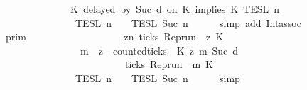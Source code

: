 \begin{isabellebody}
\ \ \ \ \ \ \ \ \ \ \ \ \ \ \ \ {\isasyminter}\ {\isasymlbrakk}\ K\ delayed\ by\ {\isacharparenleft}Suc\ d{\isacharparenright}\ on\ K\ implies\ K\ {\isasymrbrakk}\isactrlsub T\isactrlsub E\isactrlsub S\isactrlsub L\isactrlbsup {\isasymge}\ n\isactrlesup \isanewline
\ \ \ \ \ \ \ \ \ \ \ \ \ \ \ \ {\isasyminter}\ {\isasymlbrakk}{\isasymlbrakk}\ {\isasymPsi}\ {\isasymrbrakk}{\isasymrbrakk}\isactrlsub T\isactrlsub E\isactrlsub S\isactrlsub L\isactrlbsup {\isasymge}\ n\isactrlesup \ {\isasyminter}\ {\isasymlbrakk}{\isasymlbrakk}\ {\isasymPhi}\ {\isasymrbrakk}{\isasymrbrakk}\isactrlsub T\isactrlsub E\isactrlsub S\isactrlsub L\isactrlbsup {\isasymge}\ Suc\ n\isactrlesup {\isacartoucheclose}\isanewline
\ \ \ \ \isamarkupfalse%
\ {\isacharparenleft}simp\ add{\isacharcolon}\ Int{\isacharunderscore}assoc{\isacharparenright}\isanewline
\ \ \isamarkupfalse%
\ \isamarkupfalse%
\ {\isacartoucheopen}{\isachardot}{\isachardot}{\isachardot}\ {\isacharequal}\ {\isasymlbrakk}{\isasymlbrakk}\ {\isasymGamma}\ {\isasymrbrakk}{\isasymrbrakk}\isactrlsub p\isactrlsub r\isactrlsub i\isactrlsub m\ \isanewline
\ \ \ \ \ \ \ \ \ \ \ \ \ \ \ \ {\isasyminter}\ {\isacharbraceleft}{\isasymrho}{\isachardot}\ {\isasymforall}z{\isasymge}n{\isachardot}\ ticks\ {\isacharparenleft}{\isacharparenleft}Rep{\isacharunderscore}run\ {\isasymrho}{\isacharparenright}\ z\ K\ {\isasymlongrightarrow}\isanewline
\ \ \ \ \ \ \ \ \ \ \ \ \ \ \ \ \ \ \ \ {\isacharparenleft}{\isasymforall}m\ {\isasymge}\ z{\isachardot}\ \ counted{\isacharunderscore}ticks\ {\isasymrho}\ K\ z\ m\ {\isacharparenleft}Suc\ d{\isacharparenright}\isanewline
\ \ \ \ \ \ \ \ \ \ \ \ \ \ \ \ \ \ \ \ \ \ \ \ \ \ \ \ {\isasymlongrightarrow}\ ticks\ {\isacharparenleft}{\isacharparenleft}Rep{\isacharunderscore}run\ {\isasymrho}{\isacharparenright}\ m\ K\ {\isacharbraceright}\isanewline
\ \ \ \ \ \ \ \ \ \ \ \ \ \ \ \ {\isasyminter}\ {\isasymlbrakk}{\isasymlbrakk}\ {\isasymPsi}\ {\isasymrbrakk}{\isasymrbrakk}\isactrlsub T\isactrlsub E\isactrlsub S\isactrlsub L\isactrlbsup {\isasymge}\ n\isactrlesup \ {\isasyminter}\ {\isasymlbrakk}{\isasymlbrakk}\ {\isasymPhi}\ {\isasymrbrakk}{\isasymrbrakk}\isactrlsub T\isactrlsub E\isactrlsub S\isactrlsub L\isactrlbsup {\isasymge}\ Suc\ n\isactrlesup {\isacartoucheclose}\isanewline
\ \ \ \ \isamarkupfalse%
\ simp\isanewline
\ \ \isamarkupfalse%

\end{isabellebody}
